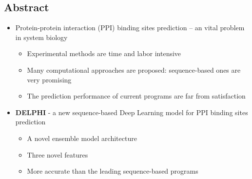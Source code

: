 \documentclass[a0,portrait]{a0poster}
\begin{document}
\begin{multicols}{2} %



\begin{mdframed}[linewidth=7pt]

\vspace*{-30pt}

\section*{\color{NavyBlue}Abstract}
\begin{itemize}
  \item Protein-protein interaction (PPI) binding sites prediction -- an vital problem in system biology
  \begin{itemize}
  \item Experimental methods are time and labor intensive
  \item Many computational approaches are proposed: sequence-based ones are very promising
  \item The prediction performance of current programs are far from satisfaction
  \end{itemize}
  \item {\color{NavyBlue}\textbf{DELPHI} - a new sequence-based Deep Learning model for PPI binding sites prediction} 
  \begin{itemize}
   \item A novel ensemble model architecture
   \item Three novel features
  \item More accurate than the leading sequence-based programs
  \end{itemize}
\end{itemize}
\end{mdframed}

\begin{mdframed}[linewidth=7pt]


\end{mdframed}
\end{multicols}
\end{document}
